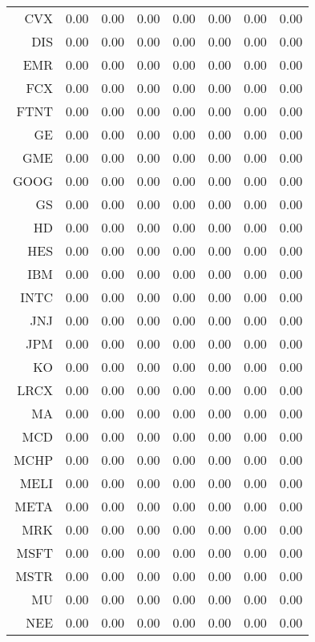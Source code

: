 \begin{table}[ht]
\begin{tabular}{rrrrrrrr}
  CVX & 0.00 & 0.00 & 0.00 & 0.00 & 0.00 & 0.00 & 0.00 \\ 
  DIS & 0.00 & 0.00 & 0.00 & 0.00 & 0.00 & 0.00 & 0.00 \\ 
  EMR & 0.00 & 0.00 & 0.00 & 0.00 & 0.00 & 0.00 & 0.00 \\ 
  FCX & 0.00 & 0.00 & 0.00 & 0.00 & 0.00 & 0.00 & 0.00 \\ 
  FTNT & 0.00 & 0.00 & 0.00 & 0.00 & 0.00 & 0.00 & 0.00 \\ 
  GE & 0.00 & 0.00 & 0.00 & 0.00 & 0.00 & 0.00 & 0.00 \\ 
  GME & 0.00 & 0.00 & 0.00 & 0.00 & 0.00 & 0.00 & 0.00 \\ 
  GOOG & 0.00 & 0.00 & 0.00 & 0.00 & 0.00 & 0.00 & 0.00 \\ 
  GS & 0.00 & 0.00 & 0.00 & 0.00 & 0.00 & 0.00 & 0.00 \\ 
  HD & 0.00 & 0.00 & 0.00 & 0.00 & 0.00 & 0.00 & 0.00 \\ 
  HES & 0.00 & 0.00 & 0.00 & 0.00 & 0.00 & 0.00 & 0.00 \\ 
  IBM & 0.00 & 0.00 & 0.00 & 0.00 & 0.00 & 0.00 & 0.00 \\ 
  INTC & 0.00 & 0.00 & 0.00 & 0.00 & 0.00 & 0.00 & 0.00 \\ 
  JNJ & 0.00 & 0.00 & 0.00 & 0.00 & 0.00 & 0.00 & 0.00 \\ 
  JPM & 0.00 & 0.00 & 0.00 & 0.00 & 0.00 & 0.00 & 0.00 \\ 
  KO & 0.00 & 0.00 & 0.00 & 0.00 & 0.00 & 0.00 & 0.00 \\ 
  LRCX & 0.00 & 0.00 & 0.00 & 0.00 & 0.00 & 0.00 & 0.00 \\ 
  MA & 0.00 & 0.00 & 0.00 & 0.00 & 0.00 & 0.00 & 0.00 \\ 
  MCD & 0.00 & 0.00 & 0.00 & 0.00 & 0.00 & 0.00 & 0.00 \\ 
  MCHP & 0.00 & 0.00 & 0.00 & 0.00 & 0.00 & 0.00 & 0.00 \\ 
  MELI & 0.00 & 0.00 & 0.00 & 0.00 & 0.00 & 0.00 & 0.00 \\ 
  META & 0.00 & 0.00 & 0.00 & 0.00 & 0.00 & 0.00 & 0.00 \\ 
  MRK & 0.00 & 0.00 & 0.00 & 0.00 & 0.00 & 0.00 & 0.00 \\ 
  MSFT & 0.00 & 0.00 & 0.00 & 0.00 & 0.00 & 0.00 & 0.00 \\ 
  MSTR & 0.00 & 0.00 & 0.00 & 0.00 & 0.00 & 0.00 & 0.00 \\ 
  MU & 0.00 & 0.00 & 0.00 & 0.00 & 0.00 & 0.00 & 0.00 \\ 
  NEE & 0.00 & 0.00 & 0.00 & 0.00 & 0.00 & 0.00 & 0.00 \\ 

\end{tabular}
\end{table}
